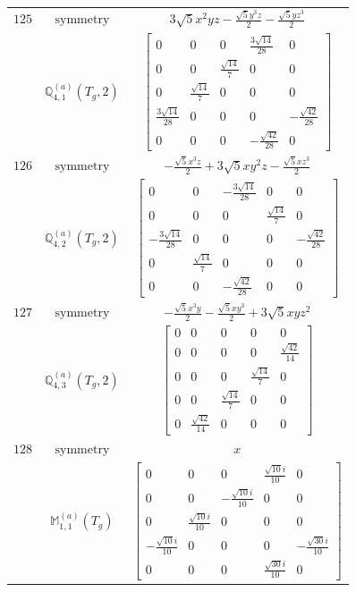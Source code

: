 \documentclass[fleqn,8pt,landscape]{jsarticle}
\begin{document}
\begin{longtable}{ccc}
$ 125 $ & $ \text{symmetry} $ & $ 3 \sqrt{5} x^{2} y z - \frac{\sqrt{5} y^{3} z}{2} - \frac{\sqrt{5} y z^{3}}{2} $ \\
$  $ & $ \mathbb{Q}_{4,1}^{(a)}(T_{g},2) $ & $ \begin{bmatrix} 0 & 0 & 0 & \frac{3 \sqrt{14}}{28} & 0 \\ 0 & 0 & \frac{\sqrt{14}}{7} & 0 & 0 \\ 0 & \frac{\sqrt{14}}{7} & 0 & 0 & 0 \\ \frac{3 \sqrt{14}}{28} & 0 & 0 & 0 & - \frac{\sqrt{42}}{28} \\ 0 & 0 & 0 & - \frac{\sqrt{42}}{28} & 0 \end{bmatrix} $ \\ \hline
$ 126 $ & $ \text{symmetry} $ & $ - \frac{\sqrt{5} x^{3} z}{2} + 3 \sqrt{5} x y^{2} z - \frac{\sqrt{5} x z^{3}}{2} $ \\
$  $ & $ \mathbb{Q}_{4,2}^{(a)}(T_{g},2) $ & $ \begin{bmatrix} 0 & 0 & - \frac{3 \sqrt{14}}{28} & 0 & 0 \\ 0 & 0 & 0 & \frac{\sqrt{14}}{7} & 0 \\ - \frac{3 \sqrt{14}}{28} & 0 & 0 & 0 & - \frac{\sqrt{42}}{28} \\ 0 & \frac{\sqrt{14}}{7} & 0 & 0 & 0 \\ 0 & 0 & - \frac{\sqrt{42}}{28} & 0 & 0 \end{bmatrix} $ \\ \hline
$ 127 $ & $ \text{symmetry} $ & $ - \frac{\sqrt{5} x^{3} y}{2} - \frac{\sqrt{5} x y^{3}}{2} + 3 \sqrt{5} x y z^{2} $ \\
$  $ & $ \mathbb{Q}_{4,3}^{(a)}(T_{g},2) $ & $ \begin{bmatrix} 0 & 0 & 0 & 0 & 0 \\ 0 & 0 & 0 & 0 & \frac{\sqrt{42}}{14} \\ 0 & 0 & 0 & \frac{\sqrt{14}}{7} & 0 \\ 0 & 0 & \frac{\sqrt{14}}{7} & 0 & 0 \\ 0 & \frac{\sqrt{42}}{14} & 0 & 0 & 0 \end{bmatrix} $ \\ \hline
$ 128 $ & $ \text{symmetry} $ & $ x $ \\
$  $ & $ \mathbb{M}_{1,1}^{(a)}(T_{g}) $ & $ \begin{bmatrix} 0 & 0 & 0 & \frac{\sqrt{10} i}{10} & 0 \\ 0 & 0 & - \frac{\sqrt{10} i}{10} & 0 & 0 \\ 0 & \frac{\sqrt{10} i}{10} & 0 & 0 & 0 \\ - \frac{\sqrt{10} i}{10} & 0 & 0 & 0 & - \frac{\sqrt{30} i}{10} \\ 0 & 0 & 0 & \frac{\sqrt{30} i}{10} & 0 \end{bmatrix} $ \\ \hline

\end{longtable}
\end{document}
